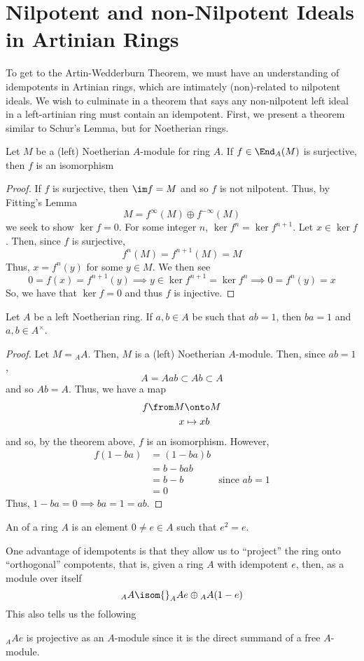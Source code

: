 \documentclass[11pt,leqno,oneside]{amsbook}
\numberwithin{thm}{section}
\begin{document}
\section{Nilpotent and non-Nilpotent Ideals in Artinian Rings}
To get to the Artin-Wedderburn Theorem, we must have an understanding
of idempotents in Artinian rings, which are intimately (non)-related to
nilpotent ideals. We wish to culminate in a theorem that says any
non-nilpotent left ideal in a left-artinian ring must contain an
idempotent. First, we present a theorem similar to Schur's Lemma, but
for Noetherian rings.
\begin{thm}
  Let \(M\) be a (left) Noetherian \(A\)-module for ring \(A\). If \(f
  \in \End_A(M)\) is surjective, then \(f\) is an isomorphism
\end{thm}
\begin{proof}
  If \(f\) is surjective, then \(\im f = M\) and so \(f\) is not
  nilpotent. Thus, by Fitting's Lemma \[
    M = f^\infty(M) \oplus f^{-\infty}(M)
  \]
  we seek to show \(\ker f = 0\). For some integer \(n\), \(\ker f^n =
  \ker f^{n+1}\). Let \(x \in \ker f\). Then, since \(f\) is
  surjective, \[
    f^n(M) = f^{n+1}(M) = M
  \]
  Thus, \(x = f^n(y)\) for some \(y \in M\). We then see \[
    0 = f(x) = f^{n+1}(y) \implies y \in \ker f^{n+1} = \ker f^n
    \implies 0 = f^n(y) = x
  \]
  So, we have that \(\ker f = 0\) and thus \(f\) is injective.
\end{proof}
\begin{thm}
  Let \(A\) be a left Noetherian ring. If \(a,b \in A\) be such that \(ab =
  1\), then \(ba = 1\) and \(a,b \in A^\times\).
\end{thm}
\begin{proof}
  Let \(M = {}_A A\). Then, \(M\) is a (left) Noetherian
  \(A\)-module. Then, since \(ab = 1\), \[
    A = Aab \subset Ab \subset A
  \]
  and so \(Ab = A\). Thus, we have a map
  \begin{align*}
    f \from M & \onto M \\
    x & \mapsto xb
  \end{align*}
  and so, by the theorem above, \(f\) is an isomorphism. However,
  \begin{align*}
    f(1-ba) & = (1-ba)b \\
            & = b-bab\\
            & = b-b & \text{since }ab = 1\\
    & = 0
  \end{align*}
  Thus, \(1-ba = 0 \implies ba = 1 = ab\). 
\end{proof}
\begin{defn}
  An  of a ring \(A\) is an element \(0 \neq e \in A\)
  such that \(e^2 = e\).
\end{defn}
One advantage of idempotents is that they allow us to ``project'' the
ring onto ``orthogonal'' compotents, that is, given a ring \(A\) with
idempotent \(e\), then, as a module over itself \[
  {}_A A \isom {}_A Ae \oplus {}_A A(1-e)
\]
This also tells us the following
\begin{rmk}
  \({}_A Ae\) is projective as an \(A\)-module since it is the direct
  summand of a free \(A\)-module.
\end{rmk}
\end{document}
